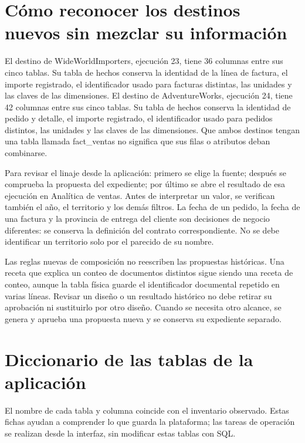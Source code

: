 \section{Cómo reconocer los destinos nuevos sin mezclar su información}
El destino de WideWorldImporters, ejecución 23, tiene 36 columnas entre sus cinco tablas. Su tabla de hechos conserva la identidad de la línea de factura, el importe registrado, el identificador usado para facturas distintas, las unidades y las claves de las dimensiones. El destino de AdventureWorks, ejecución 24, tiene 42 columnas entre sus cinco tablas. Su tabla de hechos conserva la identidad de pedido y detalle, el importe registrado, el identificador usado para pedidos distintos, las unidades y las claves de las dimensiones. Que ambos destinos tengan una tabla llamada fact\_\allowbreak{}ventas no significa que sus filas o atributos deban combinarse.

Para revisar el linaje desde la aplicación: primero se elige la fuente; después se comprueba la propuesta del expediente; por último se abre el resultado de esa ejecución en Analítica de ventas. Antes de interpretar un valor, se verifican también el año, el territorio y los demás filtros. La fecha de un pedido, la fecha de una factura y la provincia de entrega del cliente son decisiones de negocio diferentes: se conserva la definición del contrato correspondiente. No se debe identificar un territorio solo por el parecido de su nombre.

Las reglas nuevas de composición no reescriben las propuestas históricas. Una receta que explica un conteo de documentos distintos sigue siendo una receta de conteo, aunque la tabla física guarde el identificador documental repetido en varias líneas. Revisar un diseño o un resultado histórico no debe retirar su aprobación ni sustituirlo por otro diseño. Cuando se necesita otro alcance, se genera y aprueba una propuesta nueva y se conserva su expediente separado.
\section{Diccionario de las tablas de la aplicación}
El nombre de cada tabla y columna coincide con el inventario observado. Estas fichas ayudan a comprender lo que guarda la plataforma; las tareas de operación se realizan desde la interfaz, sin modificar estas tablas con SQL.

